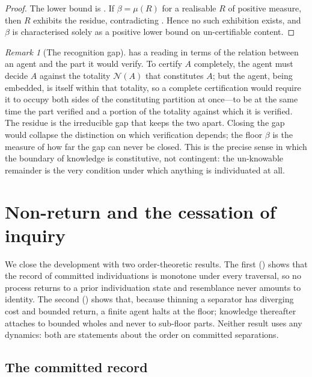 \documentclass[11pt,a4paper]{article}
\theoremstyle{thmstyle}
\theoremstyle{definition}
\theoremstyle{remark}
\newtheorem{remark}[theorem]{Remark}
\newcommand{\thick}{\beta}
\newcommand{\Neg}{\mathcal{N}}
\begin{document}
\begin{proof}
The lower bound is . If $\thick=\mu(R)$ for a realisable $R$
of positive measure, then $R$ exhibits the residue, contradicting
. Hence no such exhibition exists, and $\thick$ is
characterised solely as a positive lower bound on un-certifiable content.
\end{proof}

\begin{remark}[The recognition gap]
\label{rem:recognition-gap}
 has a reading in terms of the relation between an
agent and the part it would verify. To certify $A$ completely, the agent must
decide $A$ against the totality $\Neg(A)$ that constitutes $A$; but the agent,
being embedded, is itself within that totality, so a complete certification would
require it to occupy both sides of the constituting partition at once---to be at
the same time the part verified and a portion of the totality against which it is
verified. The residue is the irreducible gap that keeps the two apart. Closing
the gap would collapse the distinction on which verification depends; the floor
$\thick$ is the measure of how far the gap can never be closed. This is the
precise sense in which the boundary of knowledge is constitutive, not contingent:
the un-knowable remainder is the very condition under which anything is
individuated at all.
\end{remark}


\section{Non-return and the cessation of inquiry}
\label{sec:inquiry}

We close the development with two order-theoretic results. The first
() shows that the record of committed individuations is
monotone under every traversal, so no process returns to a prior individuation
state and resemblance never amounts to identity. The second
() shows that, because thinning a separator has diverging
cost and bounded return, a finite agent halts at the floor; knowledge thereafter
attaches to bounded wholes and never to sub-floor parts. Neither result uses any
dynamics: both are statements about the order on committed separations.

\subsection{The committed record}
\end{document}

